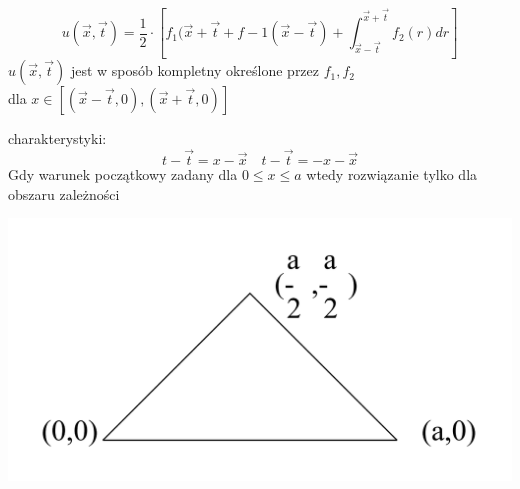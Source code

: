 \begin{frame}
\begin{equation}u(\overrightarrow{x},\overrightarrow{t}) = \frac{1}{2}\cdot \left [f_1(\overrightarrow{x}+\overrightarrow{t}+f - 1(\overrightarrow{x} -\overrightarrow{t}) +\int_{\overrightarrow{x}-\overrightarrow{t}}^{\overrightarrow{x}+\overrightarrow{t}} f_2(r)dr
\right ] \end{equation}
$u(\overrightarrow{x},\overrightarrow{t})$ jest w sposób kompletny określone przez $f_1, f_2$ \\
dla $x \in [(\overrightarrow{x}-\overrightarrow{t},0),(\overrightarrow{x}+\overrightarrow{t},0)]$

charakterystyki:
\begin{equation} t - \overrightarrow{t} = x - \overrightarrow{x}   \quad t - \overrightarrow{t} = -x - \overrightarrow{x}\end{equation}
\vspace{1mm}
Gdy warunek początkowy zadany dla $0 \le x \le a$ wtedy rozwiązanie tylko dla obszaru zależności
 \centerline{\includegraphics[height = 0.4 \textheight]{img/23/mildy_nonlinear2}}
\end{frame}
